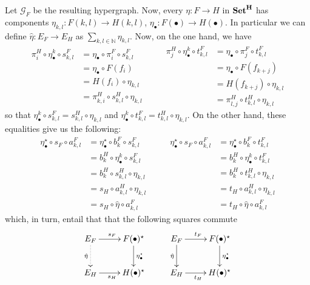\documentclass[runningheads,envcountsect]{lipics-v2021}
\newcommand{\catname}[1]{\textbf{\textup{#1}}}
\begin{document}
Let $\mathcal{G}_F$ be the resulting hypergraph. Now, every $\eta\colon F\rightarrow H$ in $\catname{Set}^{\catname{H}}$ has components $\eta_{k,l}\colon F(k,l)\to H(k,l)$, $\eta_{\bullet}\colon F(\bullet)\to H(\bullet)$. In particular we can define $\hat{\eta}\colon E_F\rightarrow E_H$ as $\sum_{k,l\in \mathbb{N}}\eta_{k,l}$. Now, on the one hand, we have
\[\begin{split}
	\pi^H_i\circ \eta^k_\bullet \circ  s^F_{k,l}&=\eta_\bullet \circ \pi^F_i \circ s^F_{k,l}\\&=\eta_\bullet \circ F(f_i)\\&=H(f_i)\circ \eta_{k,l}\\&=\pi^H_{k,i}\circ s^{H}_{k,l}\circ \eta_{k,l}
\end{split} \qquad \begin{split}
\pi^H_j\circ \eta^k_\bullet \circ  t^F_{k,l}&=\eta_\bullet \circ \pi^F_j \circ t^F_{k,l}\\&=\eta_\bullet \circ F(f_{k+j})\\&=H(f_{k+j})\circ \eta_{k,l}\\&=\pi^H_{l,j}\circ t^{H}_{k,l}\circ \eta_{k,l}
\end{split} \]
so that $\eta^k_\bullet \circ  s^F_{k,l}=s^{H}_{k,l}\circ \eta_{k,l}$ and $\eta^k_\bullet \circ  t^F_{k,l}= t^{H}_{k,l}\circ \eta_{k,l}$. On the other hand, these equalities give us the following:
\[\begin{split}
	\eta_{\bullet}^\star \circ s_{F}\circ a^F_{k,l}&=\eta_{\bullet}^\star \circ b^F_k\circ s^F_{k,l}\\&=b^H_k\circ \eta^k_{\bullet}\circ s^{F}_{k,l} \\&=b^H_{k}\circ s^H_{k,l}\circ \eta_{k,l}\\&=s_H\circ a^H_{k,l}\circ \eta_{k,l}\\&=	s_H\circ \hat{\eta}\circ a^F_{k,l}
\end{split} \qquad \begin{split}
	\eta_{\bullet}^\star \circ s_{F}\circ a^F_{k,l}&=\eta_{\bullet}^\star \circ b^F_k\circ t^F_{k,l}\\&=b^H_k\circ \eta^k_{\bullet}\circ t^{F}_{k,l} \\&=b^H_{k}\circ t^H_{k,l}\circ \eta_{k,l}\\&=t_H\circ a^H_{k,l}\circ \eta_{k,l}\\&=	t_H\circ \hat{\eta}\circ a^F_{k,l}
\end{split}\]
which, in turn, entail that  that the following squares commute
\[\xymatrix{E_F \ar[r]^{s_F} \ar@{.>}[d]_{\hat{\eta}}& F(\bullet)^\star \ar[d]^{\eta^\star_\bullet} & E_F \ar[r]^{t_F} \ar[d]_{\hat{\eta}} & F(\bullet)^\star \ar[d]^{\eta^\star_\bullet}\\ E_H \ar[r]_{s_H} & H(\bullet)^\star & E_H \ar[r]_{t_H}& H(\bullet)^\star}\]
\end{document}
